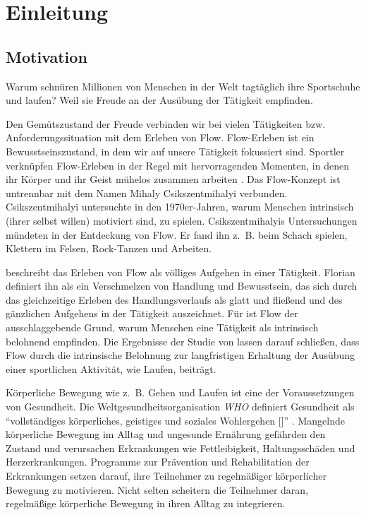 \chapter{Einleitung}
\section{Motivation}

Warum schnüren Millionen von Menschen in der Welt tagtäglich ihre Sportschuhe und laufen? Weil sie Freude an der Ausübung der Tätigkeit empfinden.

Den Gemütszustand der Freude verbinden wir bei vielen Tätigkeiten bzw. Anforderungssituation mit dem Erleben von Flow. Flow-Erleben ist ein Bewusstseinszustand, in dem wir auf unsere Tätigkeit fokussiert sind. Sportler verknüpfen Flow-Erleben in der Regel mit hervorragenden Momenten, in denen ihr Körper und ihr Geist mühelos zusammen arbeiten \citep[vgl.][S.~5]{Jackson1999}. Das Flow-Konzept ist untrennbar mit dem Namen Mihaly Csikszentmihalyi verbunden. Csikszentmihalyi untersuchte in den 1970er-Jahren, warum Menschen intrinsisch (ihrer selbst willen) motiviert sind, zu spielen. Csikszentmihalyis Untersuchungen mündeten in der Entdeckung von Flow. Er fand ihn z.~B. beim Schach spielen, Klettern im Felsen, Rock-Tanzen und Arbeiten.

\citet[][S.~58~f.]{Csikszentmihalyi2010} beschreibt das Erleben von Flow als völliges Aufgehen in einer Tätigkeit. Florian \citet[][S.~13]{Henk2014} definiert ihn als ein Verschmelzen von Handlung und Bewusstsein, das sich durch das gleichzeitige Erleben des Handlungsverlaufs als glatt und fließend und des gänzlichen Aufgehens in der Tätigkeit auszeichnet. Für \citet[][S.~602]{Csikszentmihalyi2005} ist Flow der ausschlaggebende Grund, warum Menschen eine Tätigkeit als intrinsisch belohnend empfinden. Die Ergebnisse der Studie von \citet[][S.~174]{Schuler2009} lassen darauf schließen, dass Flow durch die intrinsische Belohnung zur langfristigen Erhaltung der Ausübung einer sportlichen Aktivität, wie Laufen, beiträgt.

Körperliche Bewegung wie z.~B. Gehen und Laufen ist eine der Voraussetzungen von Gesundheit. Die Weltgesundheitsorganisation \emph{\ac{WHO}} definiert Gesundheit als "`vollständiges körperliches, geistiges und soziales Wohlergehen [\textellipsis]"' \citep[vgl.][S.~100]{WorldHealthOrganization1948}. Mangelnde körperliche Bewegung im Alltag und ungesunde Ernährung gefährden den Zustand und verursachen Erkrankungen wie Fettleibigkeit, Haltungsschäden und Herzerkrankungen. Programme zur Prävention und Rehabilitation der Erkrankungen setzen darauf, ihre Teilnehmer zu regelmäßiger körperlicher Bewegung zu motivieren. Nicht selten scheitern die Teilnehmer daran, regelmäßige körperliche Bewegung in ihren Alltag zu integrieren.

